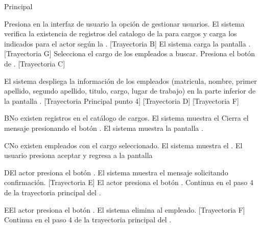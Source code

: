 \begin{UCtrayectoria}{Principal}
	
	\UCpaso[\UCactor] Presiona en la interfaz de usuario  la opción de gestionar usuarios. 
	\UCpaso  El sistema verifica la existencia de registros del catalogo de la  para cargos  y carga los indicados para el actor según la  . [Trayectoria B] 
	\UCpaso El sistema carga la pantalla  . [Trayectoria G] 
	\UCpaso[\UCactor] Selecciona el cargo de los empleados a buscar. 
	\UCpaso[\UCactor]  Presiona el botón de .  [Trayectoria C] 
	
	\UCpaso El sistema despliega la información de los empleados (matricula,  nombre, primer apellido, segundo apellido, titulo, cargo, lugar de trabajo) en la parte inferior de la pantalla . [Trayectoria Principal punto 4] [Trayectoria D] [Trayectoria F] 
\end{UCtrayectoria}

\begin{UCtrayectoriaA}{B}{No existen registros en el catálogo de cargos.}
	\UCpaso     El sistema muestra el 	
	\UCpaso[\UCactor] Cierra el mensaje presionando el botón .
	\UCpaso  El sistema muestra la pantalla  .
\end{UCtrayectoriaA}

\begin{UCtrayectoriaA}{C}{No existen  empleados con el cargo seleccionado.}
	\UCpaso     El sistema muestra el .
	\UCpaso[\UCactor] El usuario presiona aceptar y regresa a la pantalla   
\end{UCtrayectoriaA}


\begin{UCtrayectoriaA}{D}{El actor presiona el botón .}
	\UCpaso El sistema muestra el mensaje  solicitando confirmación. [Trayectoria E]
	\UCpaso[\UCactor] El actor presiona el botón .
	\UCpaso Continua en el paso 4 de la trayectoria principal del .  	
\end{UCtrayectoriaA}

\begin{UCtrayectoriaA}{E}{El actor presiona el botón .}
	\UCpaso     El sistema elimina al empleado. [Trayectoria F] 
	\UCpaso Continua en el paso 4 de la trayectoria principal del .  
\end{UCtrayectoriaA}

